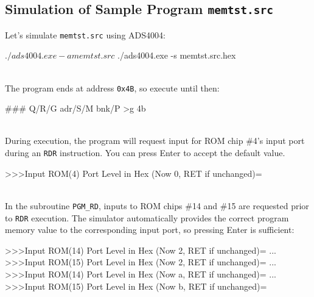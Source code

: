 \subsection{Simulation of Sample Program \texttt{memtst.src}}
Let's simulate \texttt{memtst.src} using ADS4004:\\

\begin{scriptsize}
\begin{boxedverbatim}
$ ./ads4004.exe -a memtst.src
$ ./ads4004.exe -s memtst.src.hex
\end{boxedverbatim}
\end{scriptsize}
\\

The program ends at address \texttt{0x4B}, so execute until then:\\

\begin{scriptsize}
\begin{boxedverbatim}
### Q/R/G adr/S/M bnk/P >g 4b
\end{boxedverbatim}
\end{scriptsize}
\\

During execution, the program will request input for ROM chip \#4’s input port during an \texttt{RDR} instruction.  
You can press Enter to accept the default value.\\

\begin{scriptsize}
\begin{boxedverbatim}
>>>Input ROM(4) Port Level in Hex (Now 0, RET if unchanged)=
\end{boxedverbatim}
\end{scriptsize}
\\

In the subroutine \texttt{PGM\_RD}, inputs to ROM chips \#14 and \#15 are requested prior to \texttt{RDR} execution.  
The simulator automatically provides the correct program memory value to the corresponding input port, so pressing Enter is sufficient:\\

\begin{scriptsize}
\begin{boxedverbatim}
>>>Input ROM(14) Port Level in Hex (Now 2, RET if unchanged)=
...
>>>Input ROM(15) Port Level in Hex (Now 2, RET if unchanged)=
...
>>>Input ROM(14) Port Level in Hex (Now a, RET if unchanged)=
...
>>>Input ROM(15) Port Level in Hex (Now b, RET if unchanged)=
\end{boxedverbatim}
\end{scriptsize}

